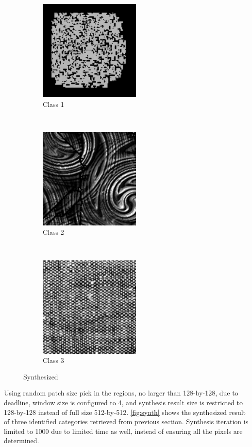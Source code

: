 \documentclass[12pt]{article}
\begin{document}
\begin{figure}[H]
    \centering
    \begin{subfigure}[t]{0.3\textwidth}
        \centering
        \includegraphics[height=2in]{images/tex1}
        \caption{Class 1}
        \label{fig:synth_1}
    \end{subfigure}%
    ~ 
    \begin{subfigure}[t]{0.3\textwidth}
        \centering
        \includegraphics[height=2in]{images/tex2}
        \caption{Class 2}
        \label{fig:synth_2}
    \end{subfigure}%
    ~
    \begin{subfigure}[t]{0.3\textwidth}
        \centering
        \includegraphics[height=2in]{images/tex3}
        \caption{Class 3}
        \label{fig:synth_3}
    \end{subfigure}%
    \caption{Synthesized}
    \label{fig:synth}
\end{figure}

Using random patch size pick in the regions, no larger than 128-by-128, due to deadline, window size is configured to 4, and synthesis result size is restricted to 128-by-128 instead of full size 512-by-512. 
\autoref{fig:synth} shows the synthesized result of three identified categories retrieved from previous section.
Synthesis iteration is limited to 1000 due to limited time as well, instead of ensuring all the pixels are determined.
\end{document}
